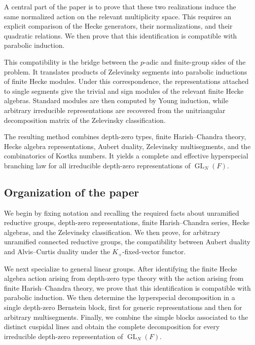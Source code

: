 \documentclass[12pt]{article}
\theoremstyle{remark}
\begin{document}
A central part of the paper is to prove that these two
realizations induce the same normalized action on the relevant
multiplicity space. This requires an explicit comparison of the
Hecke generators, their normalizations, and their quadratic
relations. We then prove that this identification is compatible
with parabolic induction.

This compatibility is the bridge between the \(p\)-adic and
finite-group sides of the problem. It translates products of
Zelevinsky segments into parabolic inductions of finite Hecke
modules. Under this correspondence, the representations
attached to single segments give the trivial and sign modules
of the relevant finite Hecke algebras. Standard modules are then
computed by Young induction, while arbitrary irreducible
representations are recovered from the unitriangular
decomposition matrix of the Zelevinsky classification.

The resulting method combines depth-zero types, finite
Harish--Chandra theory, Hecke algebra representations,
Aubert duality, Zelevinsky multisegments, and the combinatorics
of Kostka numbers. It yields a complete and effective
hyperspecial branching law for all irreducible depth-zero
representations of \(\operatorname{GL}_N(F)\).

\subsection*{Organization of the paper}

We begin by fixing notation and recalling the required facts
about unramified reductive groups, depth-zero representations,
finite Harish--Chandra series, Hecke algebras, and the
Zelevinsky classification. We then prove, for arbitrary
unramified connected reductive groups, the compatibility between
Aubert duality and Alvis--Curtis duality under the
\(K_+\)-fixed-vector functor.

We next specialize to general linear groups. After identifying
the finite Hecke algebra action arising from depth-zero type
theory with the action arising from finite Harish--Chandra
theory, we prove that this identification is compatible with
parabolic induction. We then determine the hyperspecial
decomposition in a single depth-zero Bernstein block, first for
generic representations and then for arbitrary multisegments.
Finally, we combine the simple blocks associated to the distinct
cuspidal lines and obtain the complete decomposition for every
irreducible depth-zero representation of
\(\operatorname{GL}_N(F)\).
\end{document}
